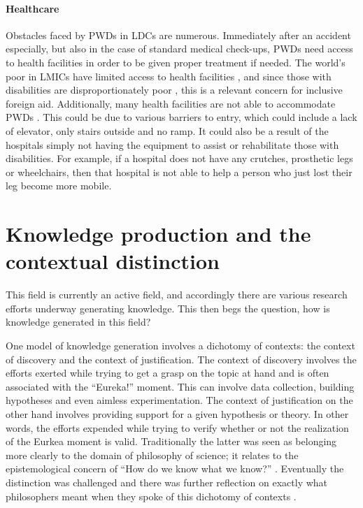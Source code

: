 \documentclass[a4paper]{article}
\begin{document}
\paragraph{Healthcare}

Obstacles faced by PWDs in LDCs are numerous. Immediately after an accident
especially, but also in the case of standard medical check-ups, PWDs need
access to health facilities in order to be given proper treatment if needed.
The world's poor in LMICs have limited access to health facilities
\citep{peters2008poverty}, and since those with disabilities are
disproportionately poor \citep{mitra2018disability}, this is a relevant
concern for inclusive foreign aid.  Additionally, many health facilities are
not able to accommodate PWDs \citep{drainoni2006cross}. This could be due to
various barriers to entry, which could include a lack of elevator, only stairs
outside and no ramp.  It could also be a result of the hospitals simply not
having the equipment to assist or rehabilitate those with disabilities. For
example, if a hospital does not have any crutches, prosthetic legs or
wheelchairs, then that hospital is not able to help a person who just lost
their leg become more mobile. 



\newpage
\section{Knowledge production and the contextual distinction}

This field is currently an active field, and accordingly there are various
research efforts underway generating knowledge. This then begs the question,
how is knowledge generated in this field?  


One model of knowledge generation involves a dichotomy of contexts: the
context of discovery and the context of justification. The context of
discovery involves the efforts exerted while trying to get a grasp on the
topic at hand and is often associated with the ``Eureka!'' moment. This can
involve data collection, building hypotheses and even aimless experimentation.
The context of justification on the other hand involves providing support for
a given hypothesis or theory. In other words, the efforts expended while
trying to verify whether or not the realization of the Eurkea moment is valid.
Traditionally the latter was seen as belonging more clearly to the domain of
philosophy of science; it relates to the epistemological concern of ``How do
we know what we know?'' \citep{schickore2014scientific}. Eventually the
distinction was challenged and there was further reflection on exactly what
philosophers meant when they spoke of this dichotomy of contexts
\citep{hoyningen2006context}.
\end{document}
